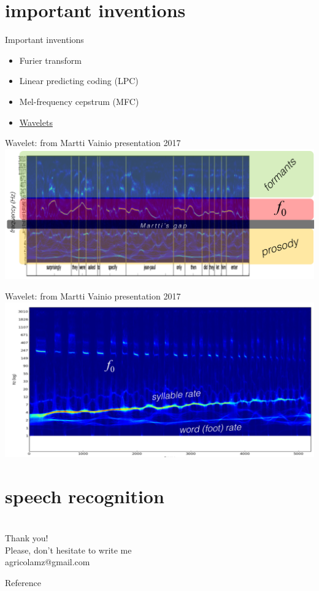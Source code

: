 \section{important inventions}
\begin{frame}{Important inventions}
\begin{itemize}
\item Furier transform
\item Linear predicting coding (LPC)
\item Mel-frequency cepstrum (MFC)
\item \href{http://stevehanov.ca/wavelet/}{Wavelets}
\end{itemize}
\end{frame}

\begin{frame}{Wavelet: from Martti Vainio presentation 2017}
\vfill
\centering
\includegraphics[width=\linewidth]{08-wavelet}
\end{frame}

\begin{frame}{Wavelet: from Martti Vainio presentation 2017}
\vfill
\centering
\includegraphics[width=\linewidth]{09-wavelet}
\end{frame}

\section{speech recognition}

\section{}
\begin{frame}
{\huge Thank you!\bigskip\\
\normalsize Please, don't hesitate to write me\\
agricolamz@gmail.com
\vspace{-130pt}}
\end{frame}
\begin{frame}{Reference}
\footnotesize


\end{frame}

